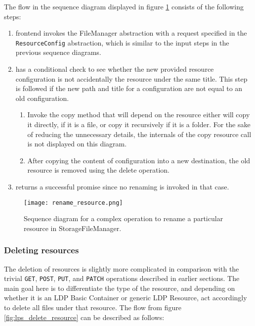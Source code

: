 The flow in the sequence diagram displayed in figure \ref{fig:lps_rename_resource} consists of the following steps:

\begin{enumerate}
    \item \lpa{} frontend invokes the FileManager abstraction with a request specified in the \texttt{ResourceConfig} abstraction, which is similar to the input steps in the previous sequence diagrams. 
    \item \lpas{} has a conditional check to see whether the new provided resource configuration is not accidentally the resource under the same title. This step is followed if the new path and title for a configuration are not equal to an old configuration.
        \begin{enumerate}
        \item Invoke the copy method that will depend on the resource either will copy it directly, if it is a file, or copy it recursively if it is a folder. For the sake of reducing the unnecessary details, the internals of the copy resource call is not displayed on this diagram.
        \item After copying the content of configuration into a new destination, the old resource is removed using the delete operation.
        \end{enumerate}
    \item \lpas{} returns a successful promise since no renaming is invoked in that case. 
\end{enumerate}

\begin{figure}[h]
\centering
\texttt{[image: rename\_resource.png]}
\caption{Sequence diagram for a complex operation to rename a particular resource in StorageFileManager.}
\label{fig:lps_rename_resource}
\end{figure}

\subsubsection{Deleting resources}

The deletion of resources is slightly more complicated in comparison with the trivial \texttt{GET}, \texttt{POST}, \texttt{PUT}, and \texttt{PATCH} operations described in earlier sections. The main goal here is to differentiate the type of the resource, and depending on whether it is an LDP Basic Container or generic LDP Resource, act accordingly to delete all files under that resource. 
The flow from figure \ref{fig:lps_delete_resource} can be described as follows:

